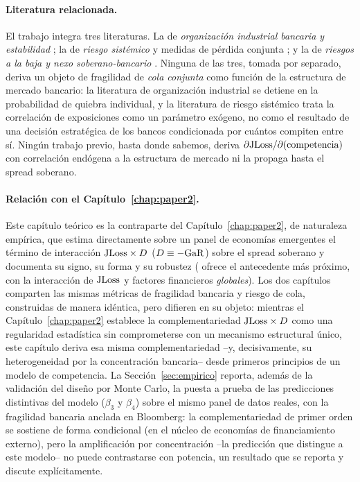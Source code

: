 \paragraph{Literatura relacionada.} El trabajo integra tres literaturas. La de \textit{organización industrial bancaria y estabilidad} \citep{Keeley1990,AllenGale2004,BoydDeNicolo2005,MMR2010,Vives2016}; la de \textit{riesgo sistémico} y medidas de pérdida conjunta \citep{Merton1974,Vasicek2002,Gordy2003,AcharyaEtAl2017,AdrianBrunnermeier2016}; y la de \textit{riesgos a la baja y nexo soberano-bancario} \citep{ABG2019,AcharyaDrechslerSchnabl2014,FarhiTirole2018,GhoshEtAl2013}. Ninguna de las tres, tomada por separado, deriva un objeto de fragilidad de \textit{cola conjunta} como función de la estructura de mercado bancario: la literatura de organización industrial se detiene en la probabilidad de quiebra individual, y la literatura de riesgo sistémico trata la correlación de exposiciones como un parámetro exógeno, no como el resultado de una decisión estratégica de los bancos condicionada por cuántos compiten entre sí. Ningún trabajo previo, hasta donde sabemos, deriva $\partial \mathrm{JLoss}/\partial(\text{competencia})$ con correlación endógena a la estructura de mercado ni la propaga hasta el spread soberano.

\paragraph{Relación con el Capítulo~\ref{chap:paper2}.} Este capítulo teórico es la contraparte del Capítulo~\ref{chap:paper2}, de naturaleza empírica, que estima directamente sobre un panel de economías emergentes el término de interacción $\mathrm{JLoss}\times D$ ($D\equiv-\mathrm{GaR}$) sobre el spread soberano y documenta su signo, su forma y su robustez (\citealp{Chari2024} ofrece el antecedente más próximo, con la interacción de $\mathrm{JLoss}$ y factores financieros \emph{globales}). Los dos capítulos comparten las mismas métricas de fragilidad bancaria y riesgo de cola, construidas de manera idéntica, pero difieren en su objeto: mientras el Capítulo~\ref{chap:paper2} establece la complementariedad $\mathrm{JLoss}\times D$ como una regularidad estadística sin comprometerse con un mecanismo estructural único, este capítulo deriva esa misma complementariedad --y, decisivamente, su heterogeneidad por la concentración bancaria-- desde primeros principios de un modelo de competencia. La Sección~\ref{sec:empirico} reporta, además de la validación del diseño por Monte Carlo, la puesta a prueba de las predicciones distintivas del modelo ($\beta_3$ y $\beta_4$) sobre el mismo panel de datos reales, con la fragilidad bancaria anclada en Bloomberg: la complementariedad de primer orden se sostiene de forma condicional (en el núcleo de economías de financiamiento externo), pero la amplificación por concentración --la predicción que distingue a este modelo-- no puede contrastarse con potencia, un resultado que se reporta y discute explícitamente.

